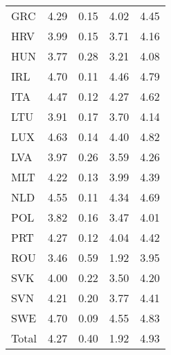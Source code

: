\begin{table}[hb!]
\begin{threeparttable}
{\begin{tabular}{l*{1}{cccc}}
GRC                 &        4.29&        0.15&        4.02&        4.45\\
HRV                 &        3.99&        0.15&        3.71&        4.16\\
HUN                 &        3.77&        0.28&        3.21&        4.08\\
IRL                 &        4.70&        0.11&        4.46&        4.79\\
ITA                 &        4.47&        0.12&        4.27&        4.62\\
LTU                 &        3.91&        0.17&        3.70&        4.14\\
LUX                 &        4.63&        0.14&        4.40&        4.82\\
LVA                 &        3.97&        0.26&        3.59&        4.26\\
MLT                 &        4.22&        0.13&        3.99&        4.39\\
NLD                 &        4.55&        0.11&        4.34&        4.69\\
POL                 &        3.82&        0.16&        3.47&        4.01\\
PRT                 &        4.27&        0.12&        4.04&        4.42\\
ROU                 &        3.46&        0.59&        1.92&        3.95\\
SVK                 &        4.00&        0.22&        3.50&        4.20\\
SVN                 &        4.21&        0.20&        3.77&        4.41\\
SWE                 &        4.70&        0.09&        4.55&        4.83\\
Total               &        4.27&        0.40&        1.92&        4.93\\
\bottomrule
\end{tabular}}
\end{threeparttable}
\end{table}
